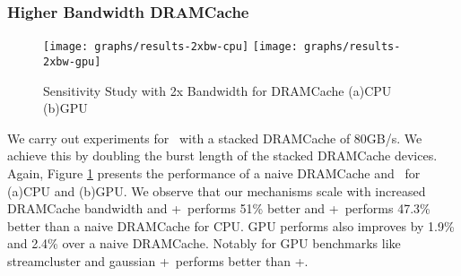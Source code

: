 \subsubsection{Higher Bandwidth DRAMCache}

\begin{figure}[!htb]
	\centering
	\texttt{[image: graphs/results-2xbw-cpu]}
	\texttt{[image: graphs/results-2xbw-gpu]}
	\caption{Sensitivity Study with 2x Bandwidth for DRAMCache (a)CPU (b)GPU}
	\label{results-ddr3-2133}
\end{figure}

We carry out experiments for \cachename\ with a stacked DRAMCache of 80GB/s. We achieve this by doubling the burst length of the stacked DRAMCache devices. Again, Figure \ref{results-ddr3-2133}  presents the performance of a naive DRAMCache and \cachename\ for (a)CPU and (b)GPU. We observe that our mechanisms scale with increased DRAMCache bandwidth and \bypassname+\prioname\ performs 51\% better and \chaining+\prioname\ performs 47.3\% better than a naive DRAMCache for CPU. GPU performs also improves by 1.9\% and 2.4\% over a naive DRAMCache. Notably for GPU benchmarks like streamcluster and gaussian \chaining+\prioname\ performs better than \bypassname+\prioname.
